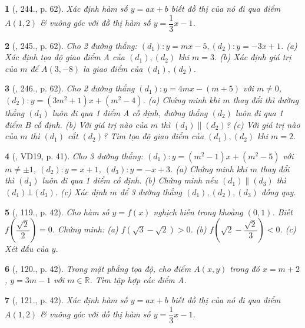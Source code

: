\documentclass{article}
\newtheorem{baitoan}{}
\begin{document}
\begin{baitoan}[\cite{Tuyen_Toan_8}, 244., p. 62]
	Xác định hàm số $y = ax + b$ biết đồ thị của nó đi qua điểm $A(1,2)$ \& vuông góc với đồ thị hàm số $y = \dfrac{1}{3}x - 1$.
\end{baitoan}

\begin{baitoan}[\cite{Tuyen_Toan_8}, 245., p. 62]
	Cho 2 đường thẳng: $(d_1):y = mx - 5,(d_2):y = -3x + 1$. (a) Xác định tọa độ giao điểm A của $(d_1),(d_2)$ khi $m = 3$. (b) Xác định giá trị của $m$ để $A(3,-8)$ la giao điểm của $(d_1),(d_2)$.
\end{baitoan}

\begin{baitoan}[\cite{Tuyen_Toan_8}, 246., p. 62]
	Cho 2 đường thẳng $(d_1):y = 4mx - (m + 5)$ với $m\ne0$, $(d_2):y = (3m^2 + 1)x + (m^2 - 4)$. (a) Chứng minh khi $m$ thay đổi thì đường thẳng $(d_1)$ luôn đi qua 1 điểm A cố định, đường thẳng $(d_2)$ luôn đi qua 1 điểm B cố định. (b) Với giá trị nào của $m$ thì $(d_1)\parallel(d_2)$? (c) Với giá trị nào của $m$ thì $(d_1)$ cắt $(d_2)$? Tìm tọa độ giao điểm của $(d_1),(d_2)$ khi $m = 2$.
\end{baitoan}

\begin{baitoan}[\cite{Tuyen_Toan_9_old}, VD19, p. 41]
	Cho 3 đường thẳng: $(d_1):y = (m^2 - 1)x + (m^2 - 5)$ với $m\ne\pm1$, $(d_2):y = x + 1$, $(d_3):y = -x + 3$. (a) Chứng minh khi $m$ thay đổi thì $(d_1)$ luôn đi qua 1 điểm cố định. (b) Chứng minh nếu $(d_1)\parallel(d_3)$ thì $(d_1)\bot(d_3)$. (c) Xác định $m$ để 3 đường thẳng $(d_1),(d_2),(d_3)$ đồng quy.
\end{baitoan}

\begin{baitoan}[\cite{Tuyen_Toan_9_old}, 119., p. 42]
	Cho hàm số $y = f(x)$ nghịch biến trong khoảng $(0,1)$. Biết $f\left(\dfrac{\sqrt{2}}{2}\right) = 0$. Chứng minh: (a) $f(\sqrt{3} - \sqrt{2}) > 0$. (b) $f\left(\sqrt{2} - \dfrac{\sqrt{2}}{3}\right) < 0$. (c) Xét dấu của $y$.
\end{baitoan}

\begin{baitoan}[\cite{Tuyen_Toan_9_old}, 120., p. 42]
	Trong mặt phẳng tọa độ, cho điểm $A(x,y)$ trong đó $x = m + 2$, $y = 3m - 1$ với $m\in\mathbb{R}$. Tìm tập hợp các điểm A.
\end{baitoan}

\begin{baitoan}[\cite{Tuyen_Toan_9_old}, 121., p. 42]
	Xác định hàm số $y = ax + b$ biết đồ thị của nó đi qua điểm $A(1,2)$ \& vuông góc với đồ thị hàm số $y = \dfrac{1}{3}x - 1$.
\end{baitoan}
\end{document}
